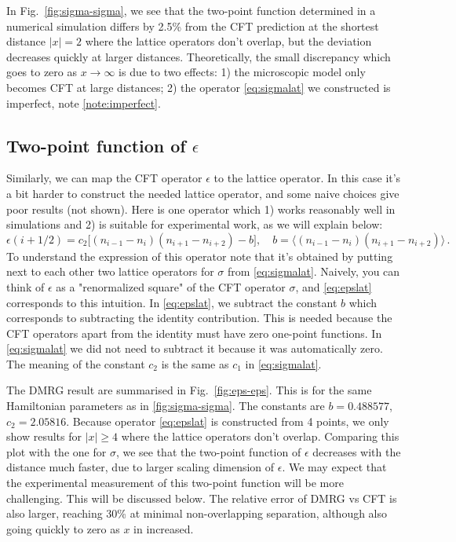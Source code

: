 \documentclass[a4paper,11pt]{article}
\newcommand{\beq}{\begin{equation}}
\newcommand{\eeq}{\end{equation}}
\theoremstyle{remark}
\theoremstyle{theorem}
\begin{document}
In Fig.~\ref{fig:sigma-sigma}, we see that the two-point function determined in a numerical simulation differs by 2.5\% from the CFT prediction at the shortest distance $|x|=2$ where the lattice operators don't overlap, but the deviation decreases quickly at larger distances. Theoretically, the small discrepancy which goes to zero as $x\to\infty$ is due to two effects: 1) the microscopic model only becomes CFT at large distances; 2) the operator \eqref{eq:sigmalat} we constructed is imperfect, note \ref{note:imperfect}.

\subsection{Two-point function of $\epsilon$}


Similarly, we can map the CFT operator $\epsilon$ to the lattice operator. In this case it's a bit harder to construct the needed lattice operator, and some naive choices give poor results (not shown). Here is one operator which 1) works reasonably well in simulations and 2) is suitable for experimental work, as we will explain below:
\beq
\epsilon(i+1/2)=c_2 \big[ (n_{i-1} -n_{i})(n_{i+1} -n_{i+2}) - b \big], \quad b =\langle (n_{i-1} -n_{i})(n_{i+1} -n_{i+2}) \rangle\,.
\label{eq:epslat}
\eeq
To understand the expression of this operator note that it's obtained by putting next to each other two lattice operators for $\sigma$ from \eqref{eq:sigmalat}. Naively, you can think of $\epsilon$ as a "renormalized square" of the CFT operator $\sigma$, and \eqref{eq:epslat} corresponds to this intuition. In \eqref{eq:epslat}, we subtract the constant $b$ which corresponds to subtracting the identity contribution. This is needed because the CFT operators apart from the identity must have zero one-point functions.
In \eqref{eq:sigmalat} we did not need to subtract it because it was automatically zero. The meaning of the constant $c_2$ is the same as $c_1$ in \eqref{eq:sigmalat}.

The DMRG result are summarised in Fig.~\ref{fig:eps-eps}. This is for the same Hamiltonian parameters as in \eqref{fig:sigma-sigma}. The constants are $b =0.488577$, $c_2 = 2.05816$. Because operator \eqref{eq:epslat} is constructed from 4 points, we only show results for $|x|\ge 4$ where the lattice operators don't overlap. Comparing this plot with the one for $\sigma$, we see that the two-point function of $\epsilon$ decreases with the distance much faster, due to larger scaling dimension of $\epsilon$. We may expect that the experimental measurement of this two-point function will be more challenging. This will be discussed below. The relative error of DMRG vs CFT is also larger, reaching 30\% at minimal non-overlapping separation, although also going quickly to zero as $x$ in increased.
\end{document}
